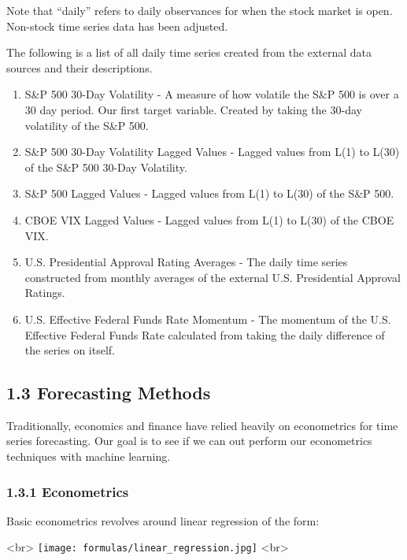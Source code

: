 \documentclass[]{article}
\providecommand{\tightlist}{%
  \setlength{\itemsep}{0pt}\setlength{\parskip}{0pt}}
\begin{document}
Note that ``daily'' refers to daily observances for when the stock
market is open. Non-stock time series data has been adjusted.

The following is a list of all daily time series created from the
external data sources and their descriptions.

\begin{enumerate}
\def\labelenumi{\arabic{enumi}.}
\tightlist
\item
  S\&P 500 30-Day Volatility - A measure of how volatile the S\&P 500 is
  over a 30 day period. Our first target variable. Created by taking the
  30-day volatility of the S\&P 500.
\item
  S\&P 500 30-Day Volatility Lagged Values - Lagged values from L(1) to
  L(30) of the S\&P 500 30-Day Volatility.
\item
  S\&P 500 Lagged Values - Lagged values from L(1) to L(30) of the S\&P
  500.
\item
  CBOE VIX Lagged Values - Lagged values from L(1) to L(30) of the CBOE
  VIX.
\item
  U.S. Presidential Approval Rating Averages - The daily time series
  constructed from monthly averages of the external U.S. Presidential
  Approval Ratings.
\item
  U.S. Effective Federal Funds Rate Momentum - The momentum of the U.S.
  Effective Federal Funds Rate calculated from taking the daily
  difference of the series on itself.
\end{enumerate}

\subsection{1.3 Forecasting Methods}\label{forecasting-methods}

Traditionally, economics and finance have relied heavily on econometrics
for time series forecasting. Our goal is to see if we can out perform
our econometrics techniques with machine learning.

\subsubsection{1.3.1 Econometrics}\label{econometrics}

Basic econometrics revolves around linear regression of the form:

\begin{center} <br>
\texttt{[image: formulas/linear\_regression.jpg]} <br>
\end{center}
\end{document}

